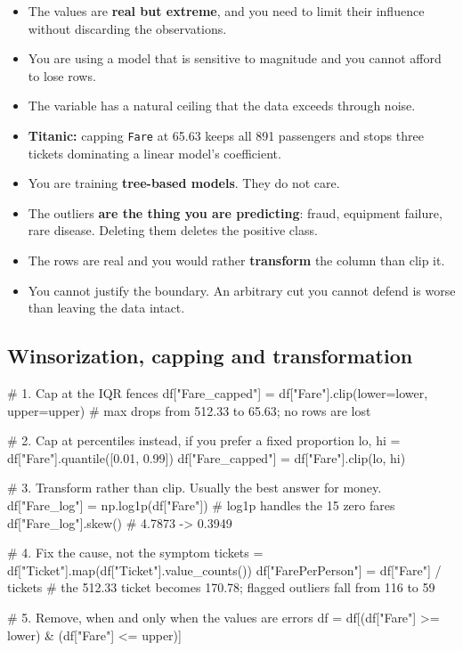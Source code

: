 \documentclass[11pt,a4paper]{article}
\begin{document}

\begin{itemize}\itemsep2pt
  \item The values are \textbf{real but extreme}, and you need to limit their influence
        without discarding the observations.
  \item You are using a model that is sensitive to magnitude and you cannot afford to lose
        rows.
  \item The variable has a natural ceiling that the data exceeds through noise.
  \item \textbf{Titanic:} capping \texttt{Fare} at 65.63 keeps all 891 passengers and stops
        three tickets dominating a linear model's coefficient.
\end{itemize}


\begin{itemize}\itemsep2pt
  \item You are training \textbf{tree-based models}. They do not care.
  \item The outliers \textbf{are the thing you are predicting}: fraud, equipment failure,
        rare disease. Deleting them deletes the positive class.
  \item The rows are real and you would rather \textbf{transform} the column than clip it.
  \item You cannot justify the boundary. An arbitrary cut you cannot defend is worse than
        leaving the data intact.
\end{itemize}

\subsection{Winsorization, capping and transformation}


\begin{py}
# 1. Cap at the IQR fences
df["Fare_capped"] = df["Fare"].clip(lower=lower, upper=upper)
# max drops from 512.33 to 65.63; no rows are lost

# 2. Cap at percentiles instead, if you prefer a fixed proportion
lo, hi = df["Fare"].quantile([0.01, 0.99])
df["Fare_capped"] = df["Fare"].clip(lo, hi)

# 3. Transform rather than clip. Usually the best answer for money.
df["Fare_log"] = np.log1p(df["Fare"])   # log1p handles the 15 zero fares
df["Fare_log"].skew()                   # 4.7873 -> 0.3949

# 4. Fix the cause, not the symptom
tickets = df["Ticket"].map(df["Ticket"].value_counts())
df["FarePerPerson"] = df["Fare"] / tickets
# the 512.33 ticket becomes 170.78; flagged outliers fall from 116 to 59

# 5. Remove, when and only when the values are errors
df = df[(df["Fare"] >= lower) & (df["Fare"] <= upper)]
\end{py}
\end{document}
